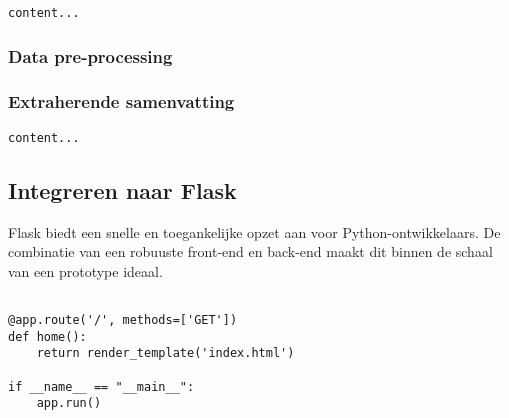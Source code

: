 \begin{lstlisting}
content...
\end{lstlisting}

\subsubsection{Data pre-processing}

\subsubsection{Extraherende samenvatting}

\begin{lstlisting}
content...
\end{lstlisting}

\subsection{Integreren naar Flask}

Flask biedt een snelle en toegankelijke opzet aan voor Python-ontwikkelaars. De combinatie van een robuuste front-end en back-end maakt dit binnen de schaal van een prototype ideaal.

\begin{lstlisting}

@app.route('/', methods=['GET'])
def home():
	return render_template('index.html')

if __name__ == "__main__":
	app.run()
\end{lstlisting}



